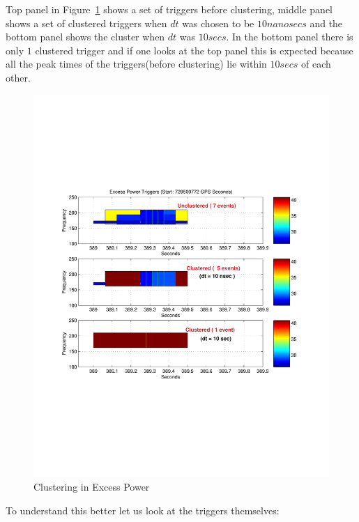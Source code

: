 Top panel in Figure~\ref{fig:checkcluster}  shows a set of triggers before
clustering,  middle panel shows a set of clustered triggers when $dt$ was
chosen to be $10  nanosecs$ and the bottom panel shows the cluster when
$dt$ was $10  secs$. In the bottom panel there is only $1$ clustered
trigger and if one looks at the top panel this is expected because all the
peak  times of the triggers(before clustering)  lie within $10  secs$ of
each other.
\begin{figure}
\centering
\includegraphics[width=1.0\textwidth]{figures/checkclustering_dt10nsec10sec}
\caption{Clustering in Excess Power}
\label{fig:checkcluster}
\end{figure}

To understand this better let us look at the triggers themselves:

\vspace{0.1 in}

